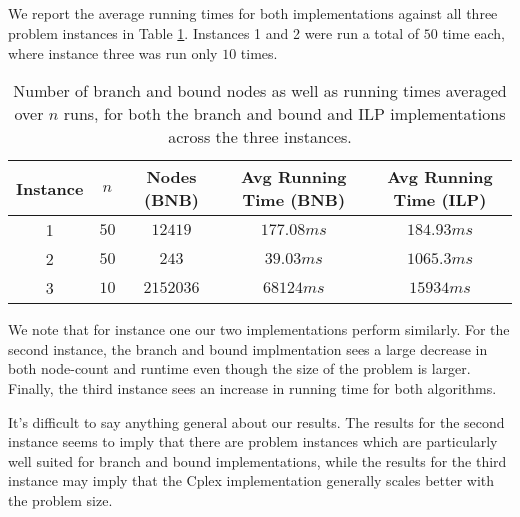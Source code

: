 \documentclass[11pt,a4paper,english]{article}
\begin{document}
\subsection{}
We report the average running times for both implementations against all three problem instances in Table \ref{tab:res}.
 Instances 1 and 2 were run a total of $50$ time each, where instance three was run only $10$ times.
\begin{table}[h!]
  \centering
  \begin{tabular}{|c|c|c|c|c|}\hline
    Instance& $n$ &Nodes (BNB)&Avg Running Time (BNB)& Avg Running Time (ILP) \\\hline
    1 &$50$ & $12419$ & $177.08ms$ & $184.93ms$  \\
    2 &$50$ &$243$ & $39.03ms$ & $1065.3ms$ \\
    3 &$10$ &$2152036$ & $68124ms$ & $15934ms$ \\\hline
  \end{tabular}
  \caption{Number of branch and bound nodes as well as running times averaged over $n$ runs,
    for both the branch and bound
    and ILP implementations across the three instances.}
  \label{tab:res}
\end{table}

We note that for instance one our two implementations perform similarly. For the second instance, the branch and bound
implmentation sees a large decrease in both node-count and runtime even though the size of the problem is larger.
Finally, the third instance sees an increase in running time for both algorithms.

It's difficult to say anything general about our results. The results for the second instance seems to imply that there are
problem instances which are particularly well suited for branch and bound implementations, while the results for the third
 instance may imply that the Cplex implementation generally scales better with the problem size.

\clearpage


\end{document}
